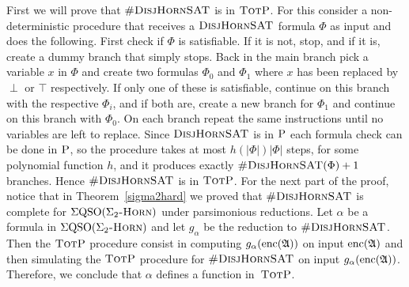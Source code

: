 First we will prove that $\textsc{\#DisjHornSAT}$ is in $\text{\sc TotP}$. For this consider a non-deterministic procedure that receives a $\textsc{DisjHornSAT}$ formula $\Phi$ as input and does the following. First check if $\Phi$ is satisfiable. If it is not, stop, and if it is, create a dummy branch that simply stops. Back in the main branch pick a variable $x$ in $\Phi$ and create two formulas $\Phi_0$ and $\Phi_1$ where $x$ has been replaced by $\perp$ or $\top$ respectively. If only one of these is satisfiable, continue on this branch with the respective $\Phi_i$, and if both are, create a new branch for $\Phi_1$ and continue on this branch with $\Phi_0$. On each branch repeat the same instructions until no variables are left to replace. Since $\textsc{DisjHornSAT}$ is in $\text{\sc P}$ each formula check can be done in $\text{\sc P}$, so the procedure takes at most $h(\vert\Phi\vert)\vert\Phi\vert$ steps, for some polynomial function $h$, and it produces exactly $\textsc{\#DisjHornSAT}(\Phi)+1$ branches. Hence $\textsc{\#DisjHornSAT}$ is in $\text{\sc TotP}$. For the next part of the proof, notice that in Theorem~\ref{sigma2hard} we proved that $\textsc{\#DisjHornSAT}$ is complete for $\Sigma{\rm QSO}(\Sigma_2\textsc{-Horn})$ under parsimonious reductions. Let $\alpha$ be a formula in $\Sigma{\rm QSO}(\Sigma_2\textsc{-Horn})$ and let $g_{\alpha}$ be the reduction to $\textsc{\#DisjHornSAT}$. Then the $\text{\sc TotP}$ procedure consist in computing $g_{\alpha}({\rm enc}(\mathfrak{A}))$ on input ${\rm enc}(\mathfrak{A})$ and then simulating the $\text{\sc TotP}$ procedure for $\textsc{\#DisjHornSAT}$ on input $g_{\alpha}({\rm enc}(\mathfrak{A}))$. Therefore, we conclude that $\alpha$ defines a function in~$\text{\sc TotP}$.
